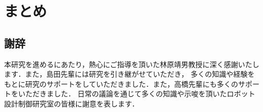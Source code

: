 \documentclass[../main]{subfiles}
\begin{document}
\setcounter{secnumdepth}{2}
    \chapter{まとめ}
        \section*{謝辞}
        本研究を進めるにあたり，熱心にご指導を頂いた林原靖男教授に深く感謝いたします．また，島田先輩には研究を引き継がせていただき，
        多くの知識や経験をもとに研究のサポートをしていただきました．また，高橋先輩にも多くのサポートをいただきました．
        日常の議論を通じて多くの知識や示唆を頂いたロボット設計制御研究室の皆様に謝意を表します．
\end{document}
